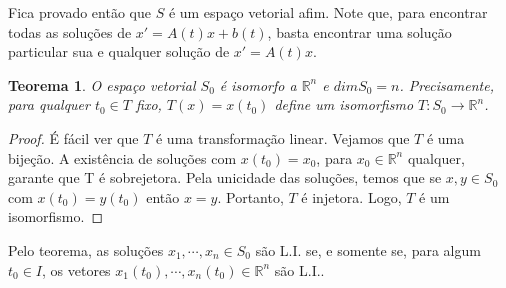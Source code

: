 \documentclass[a4paper, 12pt]{article}
\renewcommand{\Bbb}{\mathbb}
\newtheorem*{5}{Teorema}
\begin{document}
Fica provado então que $S$ é um espaço vetorial afim. Note que, para encontrar todas as soluções de $x'=A(t)x+b(t)$, basta encontrar uma solução particular sua e qualquer solução de $x'=A(t)x$.
\begin{5}
O espaço vetorial $S_0$ é isomorfo a $\Bbb R^n$ e $dimS_0=n$. Precisamente, para qualquer $t_0 \in T$ fixo, $T(x)=x(t_0)$ define um isomorfismo $T:S_0\to \Bbb R^n$.
\end{5}
\begin{proof}
É fácil ver que $T$ é uma transformação linear. Vejamos que $T$ é uma bijeção. A existência de soluções com $x(t_0) = x_0$, para $x_0 \in \Bbb R^n$ qualquer, garante que T é sobrejetora. Pela unicidade das soluções, temos que se $x,y\in S_0$ com $x(t_0)=y(t_0)$ então $x=y$. Portanto, $T$ é injetora. Logo, $T$ é um isomorfismo.
\end{proof}
Pelo teorema, as soluções $x_1,\cdots,x_n\in S_0$ são L.I. se, e somente se, para algum $t_0\in I$, os vetores $x_1(t_0),\cdots,x_n(t_0)\in \Bbb R^n$ são L.I..
\end{document}
